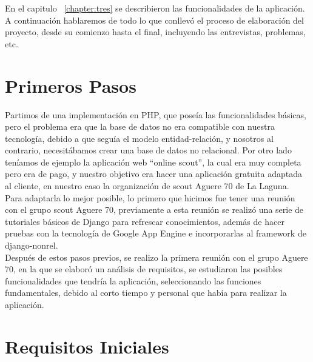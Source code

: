 

En el capitulo ~\ref{chapter:tres} se describieron las funcionalidades de la aplicación. A continuación
hablaremos de todo lo que conllevó el proceso de  elaboración del proyecto, desde su comienzo hasta el final,
incluyendo las entrevistas, problemas, etc.



\section{Primeros Pasos}
\label{4:sec1}

Partimos de una implementación en PHP, que poseía las funcionalidades básicas, pero el problema era que la base de datos
no era compatible con nuestra tecnología, debido a que seguía el modelo entidad-relación, y nosotros al contrario, necesitábamos
crear una base de datos no relacional. Por otro lado teníamos de ejemplo la aplicación web ``online scout'', la cual era muy completa
pero era de pago, y nuestro objetivo era hacer una aplicación gratuita adaptada al cliente, en nuestro caso la organización de scout Aguere 70 de La Laguna.\\

Para adaptarla lo mejor posible, lo primero que hicimos fue tener una reunión con el grupo scout Aguere 70, previamente a esta reunión se realizó una serie de tutoriales
básicos de Django para refrescar conocimientos, además de hacer pruebas con la tecnología de Google App Engine e incorporarlas al framework de django-nonrel.\\ 

Después de estos pasos previos, se realizo la primera reunión con el grupo Aguere 70, en la que se elaboró un análisis de requisitos, se estudiaron las posibles 
funcionalidades que tendría la aplicación, seleccionando las funciones fundamentales, debido al corto tiempo y personal que había para realizar la aplicación.\\

\section{Requisitos Iniciales}
\label{4:sec2}

